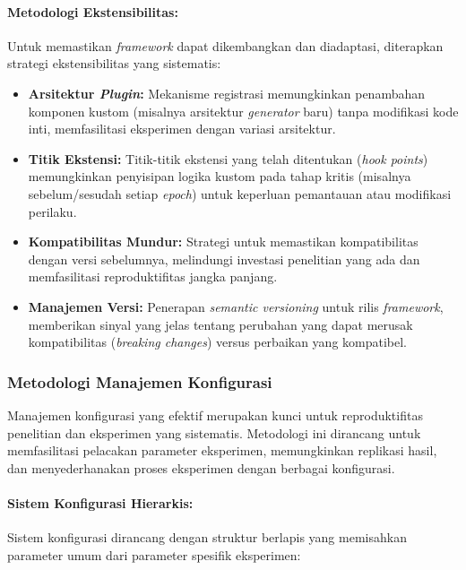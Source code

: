 \documentclass[12pt,a4paper]{article}
\begin{document}
\paragraph{Metodologi Ekstensibilitas:}
Untuk memastikan \textit{framework} dapat dikembangkan dan diadaptasi, diterapkan strategi ekstensibilitas yang sistematis:

\begin{itemize}[leftmargin=*, nosep]
\item \textbf{Arsitektur \textit{Plugin}:} Mekanisme registrasi memungkinkan penambahan komponen kustom (misalnya arsitektur \textit{generator} baru) tanpa modifikasi kode inti, memfasilitasi eksperimen dengan variasi arsitektur.

\item \textbf{Titik Ekstensi:} Titik-titik ekstensi yang telah ditentukan (\textit{hook points}) memungkinkan penyisipan logika kustom pada tahap kritis (misalnya sebelum/sesudah setiap \textit{epoch}) untuk keperluan pemantauan atau modifikasi perilaku.

\item \textbf{Kompatibilitas Mundur:} Strategi untuk memastikan kompatibilitas dengan versi sebelumnya, melindungi investasi penelitian yang ada dan memfasilitasi reproduktifitas jangka panjang.

\item \textbf{Manajemen Versi:} Penerapan \textit{semantic versioning} untuk rilis \textit{framework}, memberikan sinyal yang jelas tentang perubahan yang dapat merusak kompatibilitas (\textit{breaking changes}) versus perbaikan yang kompatibel.
\end{itemize}

\subsubsection{Metodologi Manajemen Konfigurasi}
Manajemen konfigurasi yang efektif merupakan kunci untuk reproduktifitas penelitian dan eksperimen yang sistematis. Metodologi ini dirancang untuk memfasilitasi pelacakan parameter eksperimen, memungkinkan replikasi hasil, dan menyederhanakan proses eksperimen dengan berbagai konfigurasi.

\paragraph{Sistem Konfigurasi Hierarkis:}
Sistem konfigurasi dirancang dengan struktur berlapis yang memisahkan parameter umum dari parameter spesifik eksperimen:
\end{document}
